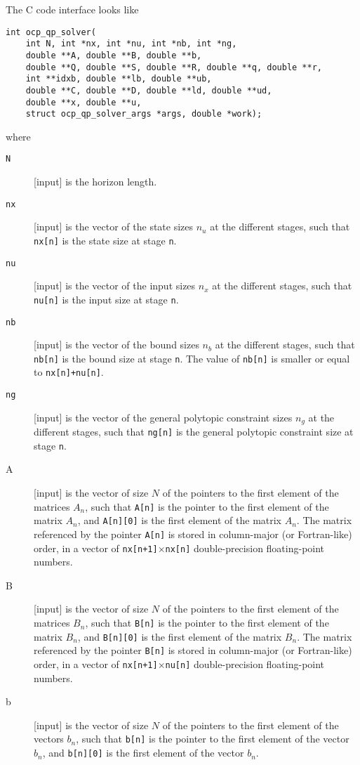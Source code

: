 \documentclass{report}
\begin{document}
The C code interface looks like
\begin{verbatim}
int ocp_qp_solver(
    int N, int *nx, int *nu, int *nb, int *ng, 
    double **A, double **B, double **b, 
    double **Q, double **S, double **R, double **q, double **r, 
    int **idxb, double **lb, double **ub, 
    double **C, double **D, double **ld, double **ud, 
    double **x, double **u,
    struct ocp_qp_solver_args *args, double *work);
\end{verbatim}
where
\begin{description}
\item[{\tt N}] [input] is the horizon length.
\item[{\tt nx}] [input] is the vector of the state sizes $n_u$ at the different stages, such that {\tt nx[n]} is the state size at stage {\tt n}.
\item[{\tt nu}] [input] is the vector of the input sizes $n_x$ at the different stages, such that {\tt nu[n]} is the input size at stage {\tt n}.
\item[{\tt nb}] [input] is the vector of the bound sizes $n_b$ at the different stages, such that {\tt nb[n]} is the bound size at stage {\tt n}.
The value of {\tt nb[n]} is smaller or equal to {\tt nx[n]+nu[n]}.
\item[{\tt ng}] [input] is the vector of the general polytopic constraint sizes $n_g$ at the different stages, such that {\tt ng[n]} is the general polytopic constraint size at stage {\tt n}.
\item[A] [input] is the vector of size $N$ of the pointers to the first element of the matrices $A_n$, such that {\tt A[n]} is the pointer to the first element of the matrix $A_n$, and {\tt A[n][0]} is the first element of the matrix $A_n$.
The matrix referenced by the pointer {\tt A[n]} is stored in column-major (or Fortran-like) order, in a vector of {\tt nx[n+1]$\times$nx[n]} double-precision floating-point numbers.
\item[B] [input] is the vector of size $N$ of the pointers to the first element of the matrices $B_n$, such that {\tt B[n]} is the pointer to the first element of the matrix $B_n$, and {\tt B[n][0]} is the first element of the matrix $B_n$.
The matrix referenced by the pointer {\tt B[n]} is stored in column-major (or Fortran-like) order, in a vector of {\tt nx[n+1]$\times$nu[n]} double-precision floating-point numbers.
\item[b] [input] is the vector of size $N$ of the pointers to the first element of the vectors $b_n$, such that {\tt b[n]} is the pointer to the first element of the vector $b_n$, and {\tt b[n][0]} is the first element of the vector $b_n$.

\end{description}
\end{document}
